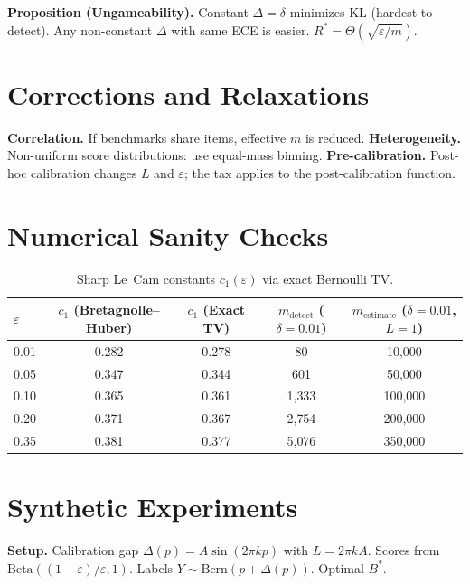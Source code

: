 \documentclass{article}
\newcommand{\Lip}{L}
\newcommand{\errrate}{\varepsilon}
\newcommand{\nsamples}{m}
\newcommand{\calmap}{\Delta}
\newcommand{\Bern}{\mathrm{Bern}}
\newcommand{\targetacc}{\delta}
\theoremstyle{definition}
\begin{document}
\textbf{Proposition (Ungameability).} Constant $\calmap = \targetacc$ minimizes KL (hardest to detect). Any non-constant $\calmap$ with same ECE is easier. $R^* = \Theta(\sqrt{\errrate/\nsamples})$.

\section{Corrections and Relaxations}
\label{app:corrections}

\textbf{Correlation.} If benchmarks share items, effective $\nsamples$ is reduced. \textbf{Heterogeneity.} Non-uniform score distributions: use equal-mass binning. \textbf{Pre-calibration.} Post-hoc calibration changes $\Lip$ and $\errrate$; the tax applies to the post-calibration function.

\section{Numerical Sanity Checks}
\label{app:numerical}

\begin{table}[h]
\centering
\caption{Sharp Le~Cam constants $c_1(\errrate)$ via exact Bernoulli TV.}
\label{tab:sharp-constants}
\small
\begin{tabular}{lcccc}
\toprule
$\errrate$ & $c_1$ (Bretagnolle--Huber) & $c_1$ (Exact TV) & $\nsamples_{\mathrm{detect}}$ ($\targetacc{=}0.01$) & $\nsamples_{\mathrm{estimate}}$ ($\targetacc{=}0.01$, $\Lip{=}1$) \\
\midrule
0.01 & 0.282 & 0.278 & 80 & 10{,}000 \\
0.05 & 0.347 & 0.344 & 601 & 50{,}000 \\
0.10 & 0.365 & 0.361 & 1{,}333 & 100{,}000 \\
0.20 & 0.371 & 0.367 & 2{,}754 & 200{,}000 \\
0.35 & 0.381 & 0.377 & 5{,}076 & 350{,}000 \\
\bottomrule
\end{tabular}
\end{table}

\section{Synthetic Experiments}
\label{app:synthetic}

\textbf{Setup.} Calibration gap $\calmap(p) = A\sin(2\pi kp)$ with $\Lip = 2\pi kA$. Scores from $\mathrm{Beta}((1{-}\errrate)/\errrate, 1)$. Labels $Y \sim \Bern(p + \calmap(p))$. Optimal $B^*$.
\end{document}
